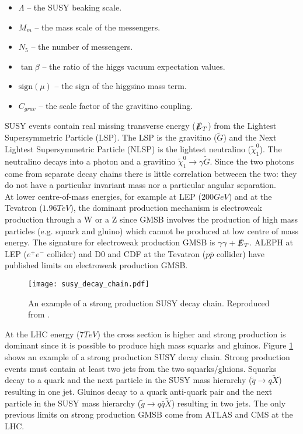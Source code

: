 \begin{itemize}
\item $\Lambda$ -- the SUSY beaking scale. 
\item $M_{m}$ -- the mass scale of the messengers.
\item $N_{5}$ -- the number of messengers.
\item $\tan\beta$ -- the ratio of the higgs vacuum expectation values.
\item $\mbox{sign}(\mu)$ -- the sign of the higgsino mass term.
\item $C_{grav}$ -- the scale factor of the gravitino coupling.
\end{itemize}

SUSY events contain real missing transverse energy ($\slashed{E}_{T}$) from the Lightest 
Supersymmetric Particle (LSP). The LSP is the gravitino ($\tilde{G}$) and the 
Next Lightest Supersymmetric Particle (NLSP) is the lightest neutralino 
($\tilde{\chi}_{1}^{0}$). The neutralino decays into a photon and a gravitino 
$\tilde{\chi}_{1}^{0}\rightarrow\gamma\tilde{G}$. Since the two photons come 
from separate decay chains there is little correlation betweeen the two: they do 
not have a particular invariant mass nor a particular angular separation. \\

At lower centre-of-mass energies, for example at LEP ($200\unit{GeV}$) and at 
the Tevatron ($1.96\unit{TeV}$), the dominant production mechanism is electroweak 
production through a W or a Z since GMSB involves the production of high mass
particles (e.g. squark and gluino) which cannot be produced at low centre of
mass energy. The signature for electroweak production GMSB is $\gamma\gamma + 
\slashed{E}_{T}$. ALEPH \cite{aleph} at LEP ($e^{+}e^{-}$ collider) and D0 \cite{d0} and 
CDF \cite{cdf} at the Tevatron ($p\bar{p}$ collider) have published limits on 
electroweak production GMSB. \\

\begin{figure}
\begin{center}
\texttt{[image: susy\_decay\_chain.pdf]}
\end{center}
\caption{An example of a strong production SUSY decay chain. Reproduced from
\cite{gmsb_at_lhc}.}
\label{fig:susydecay}
\end{figure}

At the LHC energy ($7\unit{TeV}$) the cross section is higher and strong 
production is dominant since it is possible to produce high mass squarks and
gluinos. Figure \ref{fig:susydecay} shows an example of a strong 
production SUSY decay chain. Strong production events must contain at least two 
jets from the two squarks/gluions. Squarks decay to a quark and the next 
particle in the SUSY mass hierarchy ($\tilde{q}\rightarrow q\tilde{X}$) 
resulting in one jet. Gluinos decay to a quark anti-quark pair and the next 
particle in the SUSY mass hierarchy ($\tilde{g}\rightarrow q\bar{q}\tilde{X}$) 
resulting in two jets. The only previous limits on strong production GMSB come 
from ATLAS \cite{atlas} and CMS \cite{ra3} at the LHC. \\
